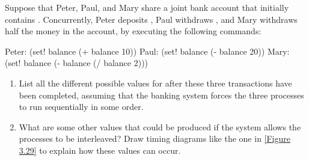 \begin{exercise}
	\label{Exercise 3.38}
	Suppose that Peter, Paul, and Mary share a joint bank account that initially contains .
	Concurrently, Peter deposits , Paul withdraws , and Mary withdraws half the money in the account, by executing the following commands:
	\begin{scheme}
	  Peter: (set! balance (+ balance 10))
	  Paul:  (set! balance (- balance 20))
	  Mary:  (set! balance (- balance (/ balance 2)))
	\end{scheme}
	\begin{enumerate}[label = \alph*., leftmargin = *]

		\item
			List all the different possible values for  after these three transactions have been completed, assuming that the banking system forces the three processes to run sequentially in some order.

		\item
			What are some other values that could be produced if the system allows the processes to be interleaved?
			Draw timing diagrams like the one in \cref{Figure 3.29} to explain how these values can occur.

	\end{enumerate}
\end{exercise}
